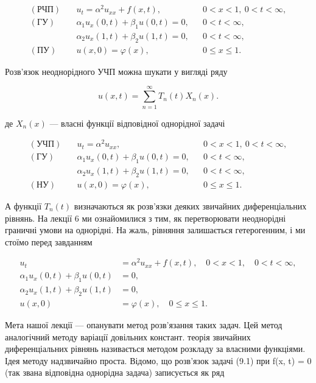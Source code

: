 \documentclass[
  ukrainian,
]{article}
\begin{document}
\[
\begin{aligned}
(\text{РЧП})\quad & u_t = \alpha^2 u_{xx} + f(x,t), && 0 < x < 1,\ 0 < t < \infty, \\
(\text{ГУ})\quad & \alpha_1 u_x(0,t) + \beta_1 u(0,t) = 0, && 0 < t < \infty, \\
& \alpha_2 u_x(1,t) + \beta_2 u(1,t) = 0, && 0 < t < \infty, \\
(\text{ПУ})\quad & u(x,0) = \varphi(x), && 0 \leqslant x \leqslant 1.
\end{aligned}
\]

Розв'язок неоднорідного УЧП можна шукати у вигляді ряду

\[
u(x,t) = \sum_{n=1}^{\infty} T_n(t) X_n(x).
\]

де \(X_n(x)\) --- власні функції відповідної однорідної задачі

\[
\begin{aligned}
(\text{УЧП})\quad & u_t = \alpha^2 u_{xx}, && 0 < x < 1,\ 0 < t < \infty, \\
(\text{ГУ})\quad & \alpha_1 u_x(0,t) + \beta_1 u(0,t) = 0, && 0 < t < \infty, \\
& \alpha_2 u_x(1,t) + \beta_2 u(1,t) = 0, && 0 < t < \infty, \\
(\text{НУ})\quad & u(x,0) = \varphi(x), && 0 \leqslant x \leqslant 1.
\end{aligned}
\]

А функції \(T_n(t)\) визначаються як розв'язки деяких звичайних
диференціальних рівнянь. На лекції 6 ми ознайомилися з тим, як
перетворювати неоднорідні граничні умови на однорідні. На жаль, рівняння
залишається гетерогенним, і ми стоїмо перед завданням

\[
\begin{aligned}
u_{t} &= \alpha^{2} u_{xx} + f(x, t), \quad 0 < x < 1, \quad 0 < t < \infty,\\
\alpha_{1} u_{x}(0, t) + \beta_{1} u(0, t) &= 0, \\
\alpha_{2} u_{x}(1, t) + \beta_{2} u(1, t) &= 0, \\
u(x, 0) &= \varphi(x), \quad 0 \le x \le 1.
\end{aligned}
\]

Мета нашої лекції --- опанувати метод розв'язання таких задач. Цей метод
аналогічний методу варіації довільних констант. теорія звичайних
диференціальних рівнянь називається методом розкладу за власними
функціями. Ідея методу надзвичайно проста. Відомо, що розв'язок задачі
(9.1) при f(x, t) = 0 (так звана відповідна однорідна задача)
записується як ряд
\end{document}
